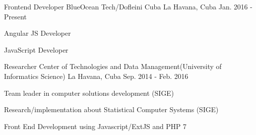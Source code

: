 


\begin{cventries}


\cventry
{Frontend Developer} %
{BlueOcean Tech/Dofleini Cuba} %
{La Havana, Cuba} %
{Jan. 2016 - Present} %
{ %
\begin{cvitems}
\item {Angular JS Developer}
\item {JavaScript Developer}
\end{cvitems}
}


\cventry
{Researcher} %
{Center of Technologies and Data Management(University of Informatics Science)} %
{La Havana, Cuba} %
{Sep. 2014 - Feb. 2016} %
{ %
\begin{cvitems}
\item {Team leader in computer solutions development (SIGE)}
\item {Research/implementation about Statistical Computer Systems (SIGE)}
\item {Front End Development using Javascript/ExtJS and PHP 7}
\end{cvitems}
}


\end{cventries}

